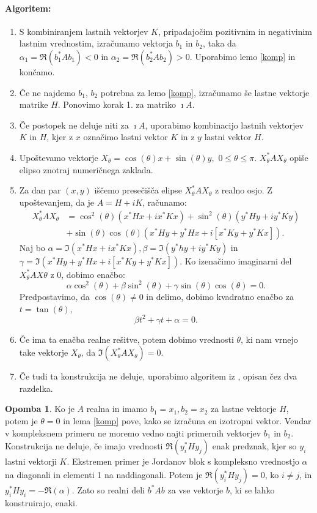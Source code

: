 \documentclass[12pt,a4paper]{amsart}
\theoremstyle{definition}
\newtheorem{opomba}[definicija]{Opomba}
\theoremstyle{plain}
\begin{document}
\paragraph{Algoritem:}
\begin{enumerate}[1.]
\item S kombiniranjem lastnih vektorjev $K$, pripadajočim pozitivnim in negativinim lastnim vrednostim, izračunamo vektorja $b_1$ in $b_2$, taka da  $\alpha_1=\Re(b_1^\ast Ab_1)<0$ in $\alpha_2=\Re(b_2^\ast Ab_2)>0$. Uporabimo lemo \ref{komp} in končamo.
\item Če ne najdemo $b_1$, $b_2$ potrebna za lemo \ref{komp}, izračunamo še lastne vektorje matrike $H$.  Ponovimo korak 1. za matriko $\imath A$.
\item Če postopek ne deluje niti za $\imath A$, uporabimo kombinacijo lastnih vektorjev $K$ in $H$, kjer z $x$ označimo lastni vektor $K$ in z $y$ lastni vektor $H$.
\item Upoštevamo vektorje $X_\theta =\cos(\theta)x+\sin(\theta)y,$ $0\le\theta\le\pi$. $X_\theta ^\ast AX_\theta$ opiše elipso znotraj numeričnega zaklada.
\item Za dan par $(x,y)$ iščemo presečišča elipse $X_\theta ^\ast AX_\theta$ z realno osjo. Z u\-po\-šte\-va\-njem, da je $A=H+iK$, računamo:
\begin{align*}
X_\theta^\ast AX_\theta &= \cos^2(\theta)(x^\ast Hx + ix^\ast Kx) + \sin^2(\theta)(y^\ast Hy + iy^\ast Ky)\\ 
&+\sin(\theta)\cos(\theta)(x^\ast Hy +y^\ast Hx +i[x^\ast Ky +y^\ast Kx]).
\end{align*}
Naj bo $\alpha=\Im(x^\ast Hx + ix^\ast Kx), \beta=\Im(y^\ast hy +iy^\ast Ky)$ in $\gamma=\Im(x^\ast Hy +y^\ast Hx +i[x^\ast Ky +y^\ast Kx]).$ Ko izenačimo imaginarni del $X_\theta ^\ast AX\theta$ z 0, dobimo enačbo:
$$\alpha \cos^2(\theta) +\beta \sin^2(\theta) +\gamma \sin(\theta)\cos(\theta)=0.$$
Predpostavimo, da $\cos(\theta) \not =0$ in delimo, dobimo kvadratno enačbo za $t=\tan(\theta),$
$$\beta t^2 +\gamma t +\alpha =0.$$
\item Če ima ta enačba realne rešitve, potem dobimo vrednosti $\theta$, ki nam vrnejo take vektorje $X_\theta$, da $\Im(X_\theta ^\ast AX_\theta)=0$.
\item Če tudi ta konstrukcija ne deluje, uporabimo algoritem iz \cite{trije}, opisan čez dva razdelka.
\end{enumerate}

\begin{opomba}
Ko je $A$ realna in imamo $b_1=x_1, b_2=x_2$ za lastne vektorje $H$, potem je $\theta=0$ in lema \ref{komp} pove, kako se izračuna en izotropni vektor. Vendar v kompleksnem primeru ne moremo vedno najti primernih vektorjev $b_1$ in $b_2$. Konstrukcija ne deluje, če imajo vrednosti $\Re(y_i^\ast Hy_j)$ enak predznak, kjer so $y_i$ lastni vektorji $K.$ Ekstremen primer je Jordanov blok s kompleksno vrednostjo $\alpha$ na diagonali in elementi 1 na naddiagonali. Potem je $\Re(y_i^\ast Hy_j)=0$, ko $i\not=j$, in $y_i^\ast Hy_i=-\Re(\alpha)$. Zato so realni deli $b^\ast Ab$ za vse vektorje $b$, ki se lahko konstruirajo, enaki.
\end{opomba}
\end{document}
